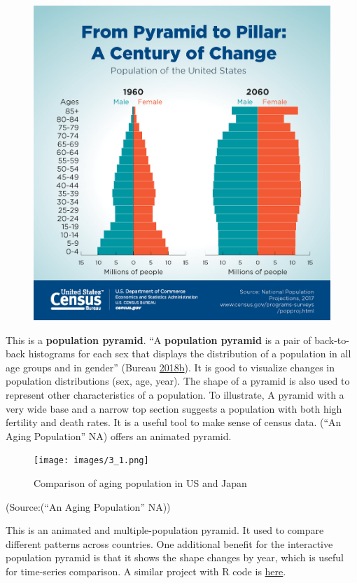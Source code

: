 \documentclass[]{book}
\begin{document}
\begin{figure}
\centering
\includegraphics{images/Pyramid.jpg}
\caption{}
\end{figure}

This is a \textbf{population pyramid}. ``A \textbf{population pyramid}
is a pair of back-to-back histograms for each sex that displays the
distribution of a population in all age groups and in gender'' (Bureau
\protect\hyperlink{ref-population_pyramid}{2018}\protect\hyperlink{ref-population_pyramid}{b}).
It is good to visualize changes in population distributions (sex, age,
year). The shape of a pyramid is also used to represent other
characteristics of a population. To illustrate, A pyramid with a very
wide base and a narrow top section suggests a population with both high
fertility and death rates. It is a useful tool to make sense of census
data. (``An Aging Population'' NA) offers an animated pyramid.

\begin{figure}
\centering
\texttt{[image: images/3\_1.png]}
\caption{Comparison of aging population in US and Japan}
\end{figure}

(Source:(``An Aging Population'' NA))

This is an animated and multiple-population pyramid. It used to compare
different patterns across countries. One additional benefit for the
interactive population pyramid is that it shows the shape changes by
year, which is useful for time-series comparison. A similar project with
R code is
\href{https://www.r-bloggers.com/who-is-old-visualizing-the-concept-of-prospective-ageing-with-animated-population-pyramids/}{here}.
\end{document}
